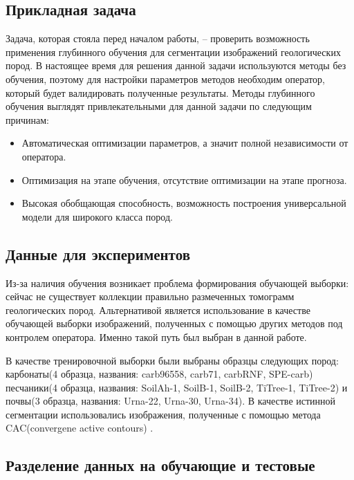 \documentclass[14pt, a4paper, oneside, bold]{extarticle}
\begin{document}
\subsection{Прикладная задача}

Задача, которая стояла перед началом работы, -- проверить возможность применения глубинного обучения для сегментации изображений геологических пород. В настоящее время для решения данной задачи используются методы без обучения, поэтому для настройки параметров методов необходим оператор, который будет валидировать полученные результаты.
Методы глубинного обучения выглядят привлекательными для данной задачи по следующим причинам:
\begin{itemize}
	\item Автоматическая оптимизации параметров, а значит полной 	независимости от оператора.
	
	\item Оптимизация на этапе обучения, отсутствие оптимизации на этапе прогноза.
	
	\item Высокая обобщающая способность, возможность построения универсальной модели для широкого класса пород.
	
\end{itemize}
 
\subsection{Данные для экспериментов}

Из-за наличия обучения возникает проблема формирования обучающей выборки: сейчас не существует коллекции правильно размеченных томограмм геологических пород. Альтернативой является использование в качестве обучающей выборки изображений, полученных с помощью других методов под контролем оператора. Именно такой путь был выбран в данной работе.

В качестве тренировочной выборки были выбраны образцы следующих пород: карбонаты(4 образца, названия: carb96558, carb71, carbRNF, SPE-carb)  песчаники(4 образца, названия: SoilAh-1, SoilB-1, SoilB-2, TiTree-1, TiTree-2) и почвы(3 образца, названия: Urna-22, Urna-30, Urna-34). В	качестве истинной сегментации использовались изображения, полученные с помощью метода CAC(convergene active contours) \cite{12}.


\subsection{Разделение данных на обучающие и тестовые}
\end{document}
